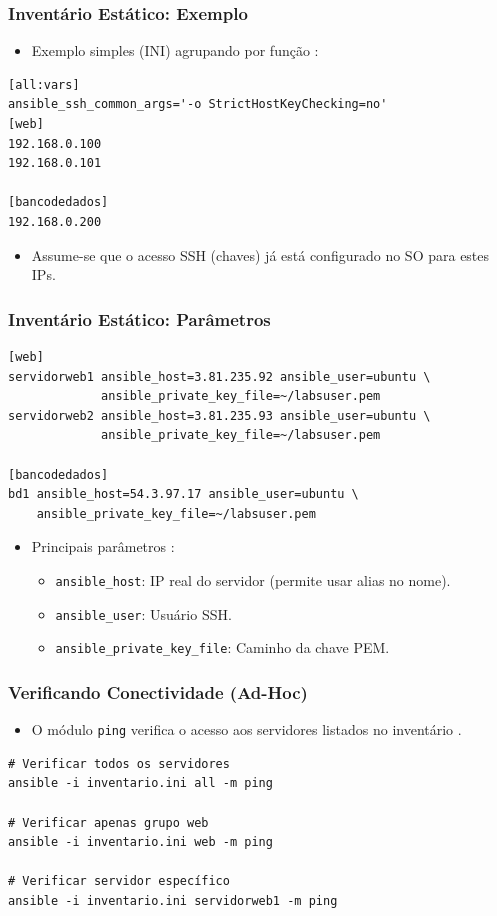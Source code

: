 \documentclass{beamer}
\begin{document}
   \begin{frame}[fragile]
      \frametitle{Inventário Estático: Exemplo}
      \begin{itemize}
      \item Exemplo simples (INI) agrupando por função :
      \end{itemize}
      \begin{verbatim}
[all:vars]
ansible_ssh_common_args='-o StrictHostKeyChecking=no'
[web]
192.168.0.100
192.168.0.101

[bancodedados]
192.168.0.200
      \end{verbatim}
      \begin{itemize}
      \item Assume-se que o acesso SSH (chaves) já está configurado no SO para estes IPs.
      \end{itemize}
   \end{frame}

   \begin{frame}[fragile]
      \frametitle{Inventário Estático: Parâmetros}
      \footnotesize
      \begin{verbatim}
[web]
servidorweb1 ansible_host=3.81.235.92 ansible_user=ubuntu \
             ansible_private_key_file=~/labsuser.pem
servidorweb2 ansible_host=3.81.235.93 ansible_user=ubuntu \
             ansible_private_key_file=~/labsuser.pem

[bancodedados]
bd1 ansible_host=54.3.97.17 ansible_user=ubuntu \
    ansible_private_key_file=~/labsuser.pem
      \end{verbatim}
      \normalsize
      \begin{itemize}
      \item Principais parâmetros :
      \begin{itemize}
      \item \texttt{ansible\_host}: IP real do servidor (permite usar alias no nome).
      \item \texttt{ansible\_user}: Usuário SSH.
      \item \texttt{ansible\_private\_key\_file}: Caminho da chave PEM.
      \end{itemize}
      \end{itemize}
   \end{frame}

   \begin{frame}[fragile]
      \frametitle{Verificando Conectividade (Ad-Hoc)}
      \begin{itemize}
      \item O módulo \texttt{ping} verifica o acesso aos servidores listados no inventário .
      \end{itemize}
      \begin{verbatim}
# Verificar todos os servidores
ansible -i inventario.ini all -m ping

# Verificar apenas grupo web
ansible -i inventario.ini web -m ping

# Verificar servidor específico
ansible -i inventario.ini servidorweb1 -m ping
      \end{verbatim}
   \end{frame}
\end{document}
